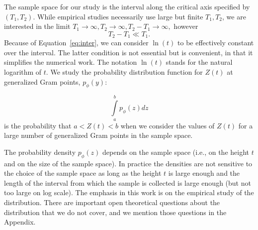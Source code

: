 \documentclass[twoside]{article}
\begin{document}
The sample space for our study is the interval along the critical axis specified by $(T_1, T_2)$. 
While empirical studies necessarily use large but finite  $T_1, T_2$, we are interested in the limit 
$T_1 \rightarrow \infty, T_2 \rightarrow \infty,  T_2-T_1 \rightarrow \infty,$ however
\begin{equation}
T_2 - T_1  \ll T_1. 
\label{eq:inter}
\end{equation}
Because of Equation~\ref{eq:inter}, we can consider  $\ln (t)$  to be effectively constant over  the interval.
The latter condition is not essential but is convenient, in that it simplifies the numerical work. 
The notation $\ln (t)$ stands for the natural logarithm of $t$.  
We study the probability distribution function for $Z(t)$ at generalized Gram  points,
 $p_{\phi}(y)$:
\begin{definition}\label{pphi}
\begin{equation}
\int\limits_{a}^{b} p_{\phi}(z)dz
\label{eq:pdfphi}
\end{equation}
is the probability that $a<Z(t)<b$ when we consider the values of $Z(t)$ for a large number of 
generalized Gram points in the sample space. 
\end{definition}
The probability density  $p_{\phi}(z)$ depends on the sample space (i.e., on the height $t$ and on the size of 
the sample space). In practice the densities are not sensitive to the choice of the sample space as long as 
the height $t$ is large enough and the length of the interval from which the sample is collected is large enough 
(but not too large on log scale). The emphasis in this work is on the empirical study of the distribution. 
There are important open theoretical questions about the distribution that we do not cover, 
and we mention those questions in the Appendix.
\end{document}

